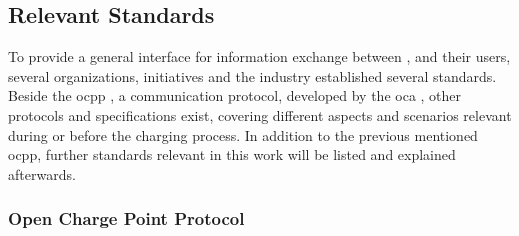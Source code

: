 \subsection{Relevant Standards}
\label{ch:Fundamentals:sec:Electric Mobility:ssec:Relevant Standards}

To provide a general interface for information exchange between ,  and their users, several organizations, initiatives and the industry established several standards.
Beside the \acrfull{ocpp} \cite{noauthor_ocpp_nodate}, a communication protocol, developed by the \acrfull{oca} \cite{noauthor_open_nodate}, other protocols and specifications exist, covering different aspects and scenarios relevant during or before the charging process.
In addition to the previous mentioned \acrshort{ocpp}, further standards relevant in this work will be listed and explained afterwards.

\subsubsection{Open Charge Point Protocol}
\label{ch:Fundamentals:sec:Electric Mobility:ssec:Relevant Standards:sssec:OCPP}

